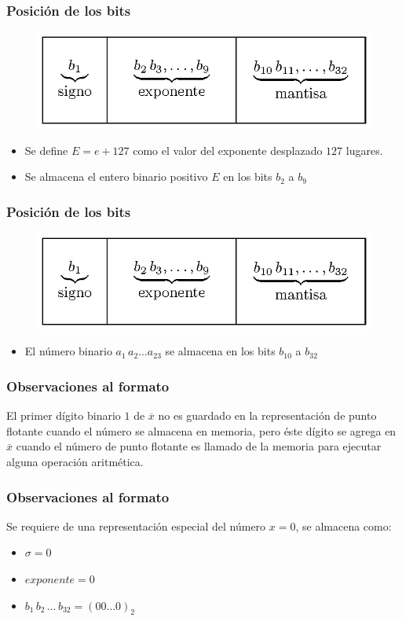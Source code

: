\begin{frame}
\frametitle{Posición de los bits}
\begin{figure}
    \centering
    \includegraphics[scale=1.2]{Imagenes/precision_simple.eps}
\end{figure}
\begin{itemize}[<+->]
\item Se define $E = e + 127$ como el valor del exponente desplazado $127$ lugares.
\item Se almacena el entero binario positivo $E$ en los bits $b_{2}$ a $b_{9}$
\end{itemize}
\end{frame}
\begin{frame}
\frametitle{Posición de los bits}
\begin{figure}
    \centering
    \includegraphics[scale=1.2]{Imagenes/precision_simple.eps}
\end{figure}
\begin{itemize}[<+->]
\item El número binario $a_{1} \, a_{2} \ldots a_{23}$ se almacena en los bits $b_{10}$ a $b_{32}$
\end{itemize}
\end{frame}
\begin{frame}
\frametitle{Observaciones al formato}
El primer dígito binario $1$ de $\overline{x}$ no es guardado en la representación de punto flotante cuando el número se almacena en memoria, pero éste dígito se agrega en $\overline{x}$ cuando el número de punto flotante es llamado de la memoria para ejecutar alguna operación aritmética.
\end{frame}
\begin{frame}
\frametitle{Observaciones al formato}
Se requiere de una representación especial del número $x = 0$, se almacena como:
\begin{itemize}
\item $\sigma = 0$
\item $exponente = 0$
\item $b_{1} \, b_{2} \, \ldots \, b_{32} = (00 \ldots 0)_{2}$
\end{itemize}
\end{frame}
